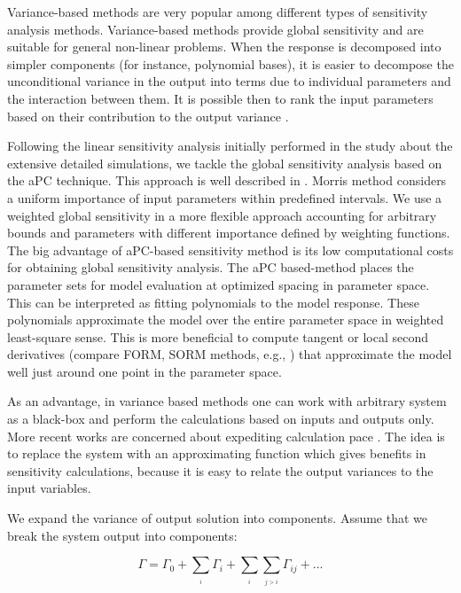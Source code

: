 Variance-based methods are very popular among different types of sensitivity
analysis methods. Variance-based methods provide global sensitivity and are suitable for general non-linear problems. When the response is decomposed into simpler
components (for instance, polynomial bases), it is easier to decompose the
unconditional variance in the output into terms due to individual parameters
and the interaction between them. It is possible then to rank the input
parameters based on their contribution to the output variance
\cite{saltelli2007global,reuter2008global}.

Following the linear sensitivity analysis initially performed in the study about
the extensive detailed simulations, we tackle the global sensitivity analysis
based on the aPC technique. This approach is well described in
\cite{oladyshkin2011concept,
OladNowakBarros_AWR2011}. Morris method \cite{Morris1991} considers a uniform
importance of input parameters within predefined intervals. We use a weighted
global sensitivity in a more flexible approach accounting for arbitrary bounds
and parameters with different importance defined by weighting functions. The
big advantage of aPC-based sensitivity method is its low computational costs
for obtaining global sensitivity analysis. The aPC based-method
places the parameter sets for model evaluation at optimized spacing in
parameter space. This can be interpreted as fitting polynomials to the model
response. These polynomials approximate the model over the entire parameter
space in weighted least-square sense. This is more beneficial to compute 
tangent or local second derivatives (compare FORM, SORM methods, e.g.,
\cite{Jang1994}) that approximate the model well just around one point in the
parameter space.
 
As an advantage, in variance based methods one can work with arbitrary system as
a black-box and perform the calculations based on inputs and outputs only. More
recent works are concerned about expediting calculation pace
\cite{crestaux2009polynomial,oladyshkin2011concept, OladNowakBarros_AWR2011}.
The idea is to replace the system with an approximating function which gives
benefits in sensitivity calculations, because it is easy to relate the output
variances to
the input variables. 

We expand the variance of output solution into
components. Assume that we break the system output into components:

\begin{equation}
\Gamma=\Gamma_{0}+\underset{_{i}}{\sum}\Gamma_{i}+\underset{_{i}}{\sum}\underset
{_{j>i}}{\sum}\Gamma_{ij}+...\label{eq:comp}\end{equation}

